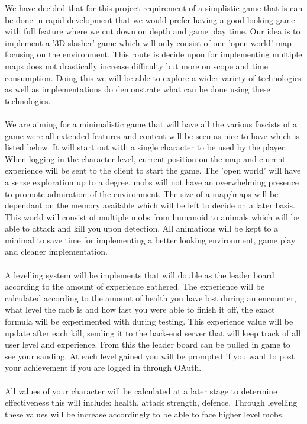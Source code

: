 \documentclass[letterpaper]{article}
\begin{document}
			We have decided that for this project requirement of a simplistic game that is can be done in rapid development that we would prefer having a good looking game with full feature where we cut down on depth and game play time. Our idea is to implement a '3D slasher' game which will only consist of one 'open world' map focusing on the environment. This route is decide upon for implementing multiple maps does not drastically increase difficulty but more on scope and time consumption. Doing this we will be able to explore a wider variety of technologies as well as implementations do demonstrate what can be done using these technologies. 
			\\
			\\
			We are aiming for a minimalistic game that will have all the various fascists of a game were all extended features and content will be seen as nice to have which is listed below. It will start out with a single character to be used by the player. When logging in the character level, current position on the map and current experience will be sent to the client to start the game. The 'open world' will have a sense exploration up to a degree, mobs will not have an overwhelming presence to promote admiration of the environment. The size of a map/maps will be dependant on the memory available which will be left to decide on a later basis. This world will consist of multiple mobs from humanoid to animals which will be able to attack and kill you upon detection. All animations will be kept to a minimal to save time for implementing a better looking environment, game play and cleaner implementation.
			\\
			\\
			A levelling system will be implements that will double as the leader board according to the amount of experience gathered. The experience will be calculated according to the amount of health you have lost during an encounter, what level the mob is and how fast you were able to finish it off, the exact formula will be experimented with during testing. This experience value will be update after each kill, sending it to the back-end server that will keep track of all user level and experience. From this the leader board can be pulled in game to see your sanding.  At each level gained you will be prompted if you want to post your achievement if you are logged in through OAuth.
			\\
			\\
			All values of your character will be calculated at a later stage to determine effectiveness this will include: health, attack strength, defence. Through levelling these values will be increase accordingly to be able to face higher level mobs.
\end{document}

